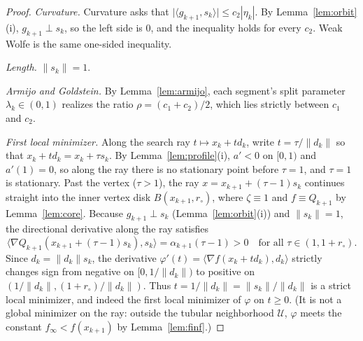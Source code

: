 \documentclass[11pt]{article}
\newcommand{\ip}[2]{\langle #1,#2\rangle}
\begin{document}
\begin{proof}
\emph{Curvature.} Curvature asks that
$\bigl|\ip{g_{k+1}}{s_k}\bigr|\le c_2|\eta_k|$. By Lemma~\ref{lem:orbit}(i),
$g_{k+1}\perp s_k$, so the left side is $0$, and the inequality holds for
every $c_2$. Weak Wolfe is the same one-sided inequality.

\emph{Length.} $\|s_k\|=1$.

\emph{Armijo and Goldstein.} By Lemma~\ref{lem:armijo}, each segment's
split parameter $\lambda_k\in(0,1)$ realizes the ratio $\rho=(c_1+c_2)/2$,
which lies strictly between $c_1$ and $c_2$.

\emph{First local minimizer.} Along the search ray $t\mapsto x_k+td_k$, write
$t=\tau/\|d_k\|$ so that $x_k+td_k = x_k+\tau s_k$.
By Lemma~\ref{lem:profile}(i), $a'<0$ on $[0,1)$
and $a'(1)=0$, so along the ray there is no stationary point before $\tau=1$, and $\tau=1$ is stationary.
Past the vertex ($\tau > 1$), the ray $x = x_{k+1} + (\tau-1)s_k$ continues straight into the inner vertex disk $B(x_{k+1}, r_\circ)$, where $\zeta \equiv 1$ and $f \equiv Q_{k+1}$ by Lemma~\ref{lem:core}.
Because $g_{k+1} \perp s_k$ (Lemma~\ref{lem:orbit}(i)) and $\|s_k\|=1$, the directional derivative along the ray satisfies
\[
\ip{\nabla Q_{k+1}(x_{k+1}+(\tau-1)s_k)}{s_k} = \alpha_{k+1}(\tau-1) > 0 \quad \text{for all } \tau \in (1, 1+r_\circ).
\]
Since $d_k = \|d_k\|s_k$, the derivative $\varphi'(t) = \ip{\nabla f(x_k+td_k)}{d_k}$ strictly changes sign from negative on $[0, 1/\|d_k\|)$ to positive on $(1/\|d_k\|, (1+r_\circ)/\|d_k\|)$.
Thus $t = 1/\|d_k\| = \|s_k\|/\|d_k\|$ is a strict local minimizer, and indeed the first local minimizer of $\varphi$ on $t\ge0$.
(It is not a global minimizer on the ray: outside the tubular neighborhood $\mathcal U$, $\varphi$ meets the constant $f_\infty < f(x_{k+1})$ by Lemma~\ref{lem:finf}.)
\end{proof}
\end{document}
